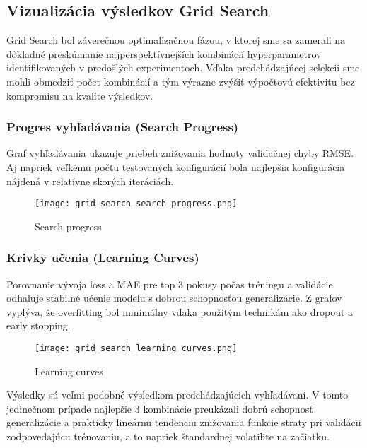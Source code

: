 \subsection{Vizualizácia výsledkov Grid Search}

Grid Search bol záverečnou optimalizačnou fázou, v ktorej sme sa zamerali na dôkladné preskúmanie najperspektívnejších kombinácií hyperparametrov identifikovaných v predošlých experimentoch. Vďaka predchádzajúcej selekcii sme mohli obmedziť počet kombinácií a tým výrazne zvýšiť výpočtovú efektivitu bez kompromisu na kvalite výsledkov.

\subsubsection{Progres vyhľadávania (Search Progress)}
Graf vyhľadávania ukazuje priebeh znižovania hodnoty validačnej chyby RMSE. Aj napriek veľkému počtu testovaných konfigurácií bola najlepšia konfigurácia nájdená v relatívne skorých iteráciách.

\begin{figure}[ht!]
\centering
\texttt{[image: grid\_search\_search\_progress.png]}
\caption{Search progress}
\label{fig:grid_search_search_progress}
\end{figure}

\newpage

\subsubsection{Krivky učenia (Learning Curves)}
Porovnanie vývoja loss a MAE pre top 3 pokusy počas tréningu a validácie odhaľuje stabilné učenie modelu s dobrou schopnosťou generalizácie. Z grafov vyplýva, že overfitting bol minimálny vďaka použitým technikám ako dropout a early stopping.

\begin{figure}[ht!]
\centering
\texttt{[image: grid\_search\_learning\_curves.png]}
\caption{Learning curves}
\label{fig:grid_search_learning_curves}
\end{figure}

Výsledky sú veľmi podobné výsledkom predchádzajúcich vyhľadávaní. V tomto jedinečnom prípade najlepšie 3 kombinácie preukázali dobrú schopnosť generalizácie a prakticky lineárnu tendenciu znižovania funkcie straty pri validácii zodpovedajúcu trénovaniu, a to napriek štandardnej volatilite na začiatku.

\newpage

